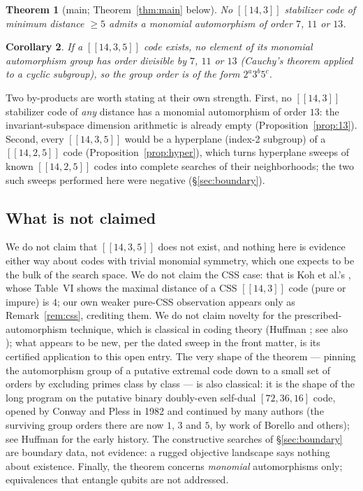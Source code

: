 \documentclass[11pt]{amsart}
\newcommand{\code}[3]{[[#1,#2,#3]]}
\theoremstyle{plain}
\newtheorem{theorem}{Theorem}[section]
\newtheorem{corollary}[theorem]{Corollary}
\theoremstyle{definition}
\theoremstyle{remark}
\begin{document}
\begin{theorem}[main; Theorem~\ref{thm:main} below]
No $[[14,3]]$ stabilizer code of minimum distance $\ge 5$ admits a
monomial automorphism of order $7$, $11$ or $13$.
\end{theorem}

\begin{corollary}
If a $\code{14}{3}{5}$ code exists, no element of its monomial
automorphism group has order divisible by $7$, $11$ or $13$ (Cauchy's
theorem applied to a cyclic subgroup), so the group order is of the form
$2^{a}3^{b}5^{c}$.
\end{corollary}

Two by-products are worth stating at their own strength. First, no
$[[14,3]]$ stabilizer code of \emph{any} distance has a monomial
automorphism of order $13$: the invariant-subspace dimension arithmetic is already empty
(Proposition~\ref{prop:13}). Second, every $\code{14}{3}{5}$ would be a
hyperplane (index-2 subgroup) of a $\code{14}{2}{5}$ code
(Proposition~\ref{prop:hyper}), which turns hyperplane sweeps of known
$\code{14}{2}{5}$ codes into complete searches of their neighborhoods; the
two such sweeps performed here were negative (\S\ref{sec:boundary}).

\subsection{What is not claimed}\label{ssec:notclaimed}
We do not claim that $\code{14}{3}{5}$ does not exist, and nothing here is
evidence either way about codes with trivial monomial symmetry, which one
expects to be the bulk of the search space. We do not claim the CSS case:
that is Koh et al.'s \cite{Koh26}, whose Table~VI shows the maximal
distance of a CSS $[[14,3]]$ code (pure or impure) is $4$; our own
weaker pure-CSS observation appears only as Remark~\ref{rem:css},
crediting them. We do not claim novelty for the prescribed-automorphism
technique, which is classical in coding theory (Huffman \cite{Huffman98};
see also \cite{CRSS}); what appears to be new, per the dated sweep in the front
matter, is its certified application to this open entry. The very shape
of the theorem --- pinning the automorphism group of a putative extremal
code down to a small set of orders by excluding primes class by class ---
is also classical: it is the shape of the long program on the putative
binary doubly-even self-dual $[72,36,16]$ code, opened by Conway and
Pless in 1982 and continued by many authors (the surviving group orders
there are now $1$, $3$ and $5$, by work of Borello and others); see
Huffman \cite{Huffman98} for the early history. The constructive
searches of \S\ref{sec:boundary} are boundary data, not evidence: a
rugged objective landscape says nothing about existence. Finally, the
theorem concerns \emph{monomial} automorphisms only; equivalences that
entangle qubits are not addressed.
\end{document}
